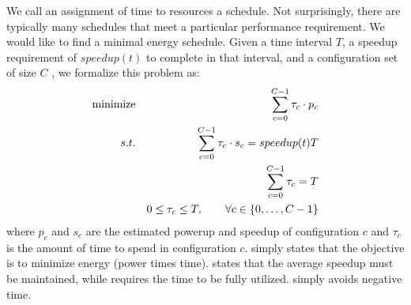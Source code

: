 We call an assignment of time to resources a schedule.  Not
surprisingly, there are typically many schedules that meet a
particular performance requirement.  We would like to find a minimal
energy schedule. Given a time interval $T$, a speedup requirement of $speedup(t)$ to
complete in that interval, and a configuration set of size $C$ , we
formalize this problem as:
\begin{eqnarray}
  \minimize && \sum_{c=0}^{C-1} \tau_c \cdot p_c \label{eqn:power} \\
  \st %
  && \sum_{c=0}^{C-1} \tau_c \cdot s_c =  speedup(t)T \label{eqn:work} \\
  && \sum_{c=0}^{C-1} \tau_c =  T \label{eqn:deadline} \\
  && 0 \le \tau_c \le T, \qquad \forall c \in \{0,\ldots,C-1\} \label{eqn:time}
\end{eqnarray}
where $p_c$ and $s_c$ are the estimated powerup and speedup of
configuration $c$ and $\tau_c$ is the amount of time to spend in
configuration $c$.   simply states that the objective is
to minimize energy (power times time).   states that the
average speedup must be maintained, while  requires the time to be fully utilized.   simply avoids negative time.


